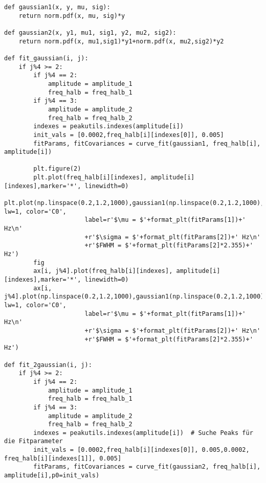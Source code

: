 \documentclass[a4paper,10pt]{article}
\begin{document}
\begin{lstlisting}
def gaussian1(x, y, mu, sig):
    return norm.pdf(x, mu, sig)*y

def gaussian2(x, y1, mu1, sig1, y2, mu2, sig2):
    return norm.pdf(x, mu1,sig1)*y1+norm.pdf(x, mu2,sig2)*y2

def fit_gaussian(i, j):
    if j%4 >= 2:
        if j%4 == 2:
            amplitude = amplitude_1
            freq_halb = freq_halb_1
        if j%4 == 3:
            amplitude = amplitude_2
            freq_halb = freq_halb_2
        indexes = peakutils.indexes(amplitude[i])
        init_vals = [0.0002,freq_halb[i][indexes[0]], 0.005]
        fitParams, fitCovariances = curve_fit(gaussian1, freq_halb[i], amplitude[i]) 
        
        plt.figure(2)
        plt.plot(freq_halb[i][indexes], amplitude[i][indexes],marker='*', linewidth=0) 
        plt.plot(np.linspace(0.2,1.2,1000),gaussian1(np.linspace(0.2,1.2,1000),*fitParams),  lw=1, color='C0',
                      label=r'$\mu = $'+format_plt(fitParams[1])+' Hz\n'
                      +r'$\sigma = $'+format_plt(fitParams[2])+' Hz\n'
                      +r'$FWHM = $'+format_plt(fitParams[2]*2.355)+' Hz') 
        fig
        ax[i, j%4].plot(freq_halb[i][indexes], amplitude[i][indexes],marker='*', linewidth=0) 
        ax[i, j%4].plot(np.linspace(0.2,1.2,1000),gaussian1(np.linspace(0.2,1.2,1000),*fitParams),  lw=1, color='C0',
                      label=r'$\mu = $'+format_plt(fitParams[1])+' Hz\n'
                      +r'$\sigma = $'+format_plt(fitParams[2])+' Hz\n'
                      +r'$FWHM = $'+format_plt(fitParams[2]*2.355)+' Hz') 

def fit_2gaussian(i, j):
    if j%4 >= 2:
        if j%4 == 2:
            amplitude = amplitude_1
            freq_halb = freq_halb_1
        if j%4 == 3:
            amplitude = amplitude_2
            freq_halb = freq_halb_2
        indexes = peakutils.indexes(amplitude[i])  # Suche Peaks für die Fitparameter
        init_vals = [0.0002,freq_halb[i][indexes[0]], 0.005,0.0002, freq_halb[i][indexes[1]], 0.005]
        fitParams, fitCovariances = curve_fit(gaussian2, freq_halb[i], amplitude[i],p0=init_vals)
        

\end{lstlisting}
\end{document}
